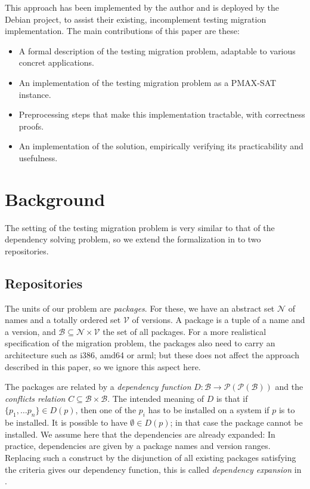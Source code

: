 \documentclass[halfparskip,11pt]{scrartcl}
\begin{document}
This approach has been implemented by the author and is deployed by the Debian project, to assist their existing, incomplement testing migration implementation. The main contributions of this paper are these:
\begin{itemize}
\item A formal description of the testing migration problem, adaptable to various concret applications.
\item An implementation of the testing migration problem as a PMAX-SAT instance.
\item Preprocessing steps that make this implementation tractable, with correctness proofs.
\item An implementation of the solution, empirically verifying its practicability and usefulness.
\end{itemize}

\section{Background}

The setting of the testing migration problem is very similar to that of the dependency solving problem, so we extend the formalization in \cite{edos} to two repositories.

\subsection{Repositories}

The units of our problem are \emph{packages}. For these, we have an abstract set $\mathcal N$ of names and a totally ordered set $\mathcal V$ of versions. A package is a tuple of a name and a version, and $\mathcal B\subseteq \mathcal N \times \mathcal V$ the set of all packages. For a more realistical specification of the migration problem, the packages also need to carry an architecture such as i386, amd64 or arml; but these does not affect the approach described in this paper, so we ignore this aspect here.

The packages are related by a \emph{dependency function} $D \colon \mathcal B \to \mathcal P(\mathcal P(\mathcal B))$ and the \emph{conflicts relation} $C\subseteq \mathcal B \times \mathcal B$. The intended meaning of $D$ is that if $\{p_1,\ldots p_n\} \in D(p)$, then one of the $p_i$ has to be installed on a system if $p$ is to be installed. It is possible to have $\emptyset\in D(p)$; in that case the package cannot be installed. We assume here that the dependencies are already expanded: In practice, dependencies are given by a package names and version ranges. Replacing such a construct by the disjunction of all existing packages satisfying the criteria gives our dependency function, this is called \emph{dependency expansion} in \cite{edos}.
\end{document}
